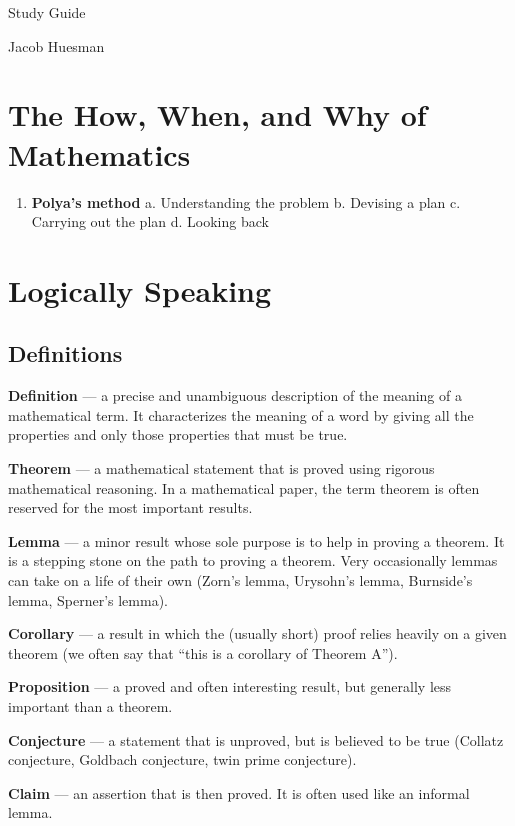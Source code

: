\documentclass{article}
\begin{document}
\centerline{\sc \large Study Guide}
\vspace{.5pc}
\centerline{\sc Jacob Huesman}

\vspace{2pc}


\section{The How, When, and Why of Mathematics}
\begin{enumerate}
	\item \textbf{Polya's method}
		\subitem a. Understanding the problem
		\subitem b. Devising a plan
		\subitem c. Carrying out the plan
		\subitem d. Looking back
\end{enumerate} 
	
	
\pagebreak
\section{Logically Speaking}
\subsection{Definitions}
\textbf{Definition} — a precise and unambiguous description of the meaning of a mathematical term.  It characterizes the meaning of a word by giving all the properties and only those properties that must be true.

\textbf{Theorem} — a mathematical statement that is proved using rigorous mathematical reasoning.  In a mathematical paper, the term theorem is often reserved for the most important results.

\textbf{Lemma} — a minor result whose sole purpose is to help in proving a theorem.  It is a stepping stone on the path to proving a theorem. Very occasionally lemmas can take on a life of their own (Zorn’s lemma, Urysohn’s lemma, Burnside’s lemma, Sperner’s lemma).

\textbf{Corollary} — a result in which the (usually short) proof relies heavily on a given theorem (we often say that “this is a corollary of Theorem A”).

\textbf{Proposition} — a proved and often interesting result, but generally less important than a theorem.

\textbf{Conjecture} — a statement that is unproved, but is believed to be true (Collatz conjecture, Goldbach conjecture, twin prime conjecture).

\textbf{Claim} — an assertion that is then proved.  It is often used like an informal lemma.
\end{document}
